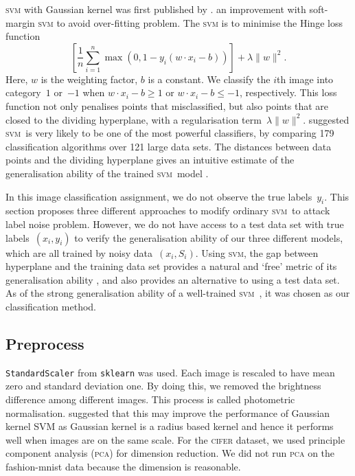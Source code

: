 \documentclass{article} %
\newcommand{\svm}{\textsc{svm}}
\begin{document}
\textsc{svm} with Gaussian kernel was first published by \citet{Boser:1992:TAO:130385.130401}. \citet{Cortes1995} an improvement with soft-margin \textsc{svm} to  avoid over-fitting problem. The \textsc{svm} is to minimise the Hinge loss function
\begin{equation*}
\left[{\frac {1}{n}}\sum _{i=1}^{n}\max \left(0,1-y_{i}(w\cdot x_{i}-b)\right)\right]+\lambda \lVert w\rVert ^{2}.   
\end{equation*}
Here, $w$ is the weighting factor, $b$ is a constant. We classify the $i$th image into category~$1$ or~$-1$ when $w\cdot x_{i}-b\geq1$ or $w\cdot x_{i}-b\leq-1$, respectively. This loss function not only penalises points that misclassified, but also points that are closed to the dividing hyperplane, with a regularisation term~$\lambda \lVert w\rVert ^{2}$. \citet{Fernandez-Delgado:2014:WNH:2627435.2697065} suggested \svm\ is very likely to be one of the most powerful classifiers, by comparing 179 classification algorithms over 121 large data sets. The distances between data points and the dividing hyperplane gives an intuitive estimate of the generalisation ability of the trained \svm\ model \citep{hastie01statisticallearning}. 

In this image classification assignment, we do not observe the true labels~$y_i$. This section proposes three different approaches to modify ordinary \svm\ to attack label noise problem. However, we do not have access to a test data set with true labels~$(x_i,y_i)$ to verify the generalisation ability of our three different models, which are all trained by noisy data~$(x_i,S_i)$. Using \svm , the gap between hyperplane and the training data set provides a natural and `free' metric of its generalisation ability  \citep{hastie01statisticallearning}, and also provides an alternative to using a test data set. As of the strong generalisation ability of a well-trained \svm\ \citep{Cortes1995,NIPS2012_4500}, it was chosen as our classification method.
\subsection{Preprocess}
\texttt{StandardScaler} from \texttt{sklearn} was used. Each image is rescaled to have mean zero and standard deviation one. By doing this, we removed the brightness difference among different images. This process is called photometric normalisation. \citet{jonsson2002support} suggested that this may improve the performance of Gaussian kernel SVM as Gaussian kernel is a radius based kernel and hence it performs well when images are on the same scale. For the \textsc{cifer} dataset, we used principle component analysis (\textsc{pca}) for dimension reduction. We did not run \textsc{pca} on the fashion-mnist data because the dimension is reasonable.
\end{document}
